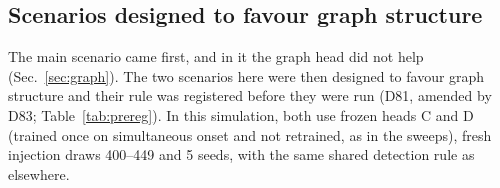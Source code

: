 \subsection{Scenarios designed to favour graph structure}
\label{sec:favour}

The main scenario came first, and in it the graph head did not help (Sec.~\ref{sec:graph}).
The two scenarios here were then designed to favour graph structure and their rule was registered before they were run (D81, amended by D83; Table~\ref{tab:prereg}).
In this simulation, both use frozen heads C and D (trained once on simultaneous onset and not retrained, as in the sweeps), fresh injection draws 400--449 and 5 seeds, with the same shared detection rule as elsewhere.
\latcaveat

